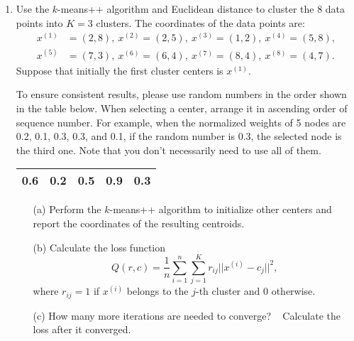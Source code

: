\documentclass[10pt]{article}
\begin{document}
\begin{enumerate}[1.]
	\item {} Use the $k$-means++ algorithm and Euclidean distance to cluster the 8 data points into $K=3$ clusters.
	      The coordinates of the data points are:
	      \begin{align*}
		      x^{(1)} & = (2,8),  \ x^{(2)} = (2,5), \ x^{(3)} = (1,2), \ x^{(4)} = (5,8), \\
		      x^{(5)} & = (7,3),  \ x^{(6)} = (6,4), \ x^{(7)} = (8,4), \ x^{(8)} = (4,7).
	      \end{align*}
	      Suppose that initially the first cluster centers is $x^{(1)}$. \\
	      {\color{blue} To ensure consistent results, please use random numbers in the order shown in the table below. When selecting a center, arrange it in ascending order of sequence number. For example, when the normalized weights of 5 nodes are 0.2, 0.1, 0.3, 0.3, and 0.1, if the random number is 0.3, the selected node is the third one. Note that you don't necessarily need to use all of them.\\
	      \begin{tabular}{|c|c|c|c|c|}
	      	\hline
	      	0.6 & 0.2 & 0.5 & 0.9 & 0.3 \\
	      	\hline
	      \end{tabular}
	      }
	      \begin{itemize}
		      \item[(a)] Perform the $k$-means++ algorithm to initialize other centers and report the coordinates of the resulting centroids. ~
		      \item[(b)] Calculate the loss function
		            \begin{equation}
			            Q(r,c) = \frac{1}{n} \sum_{i=1}^n \sum_{j=1}^K r_{ij}||x^{(i)} - c_j||^2,
		            \end{equation}
		            where $r_{ij} = 1$ if $x^{(i)}$ belongs to the $j$-th cluster and 0 otherwise. ~
		      \item[(c)] How many more iterations are needed to converge? ~ Calculate the loss after it converged.~
	      \end{itemize}
		

\end{enumerate}
\end{document}
